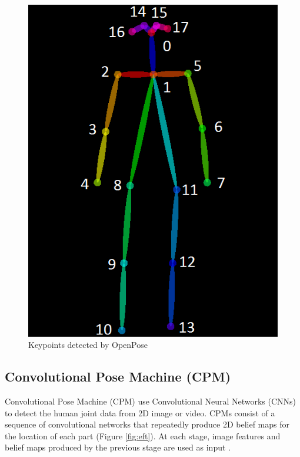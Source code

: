 \begin{figure}[htbp]
\centering\includegraphics[scale=0.55]{./img/keypoints_openpose.png}
  \caption[Keypoints detected by OpenPose]{Keypoints detected by OpenPose \cite{cao2017realtime}}\label{fig:Keypoints detected by OpenPose}
\end{figure}

\subsection*{Convolutional Pose Machine (CPM)}
 \par Convolutional Pose Machine (CPM) use Convolutional Neural Networks (CNNs) to detect the human joint data from 2D image or video. CPMs consist of a sequence of convolutional networks that repeatedly produce 2D belief maps for the location of each part (Figure \ref{fig:eft}). At each stage, image features and belief maps produced by the previous stage are used as input \cite{Wei2016}.


